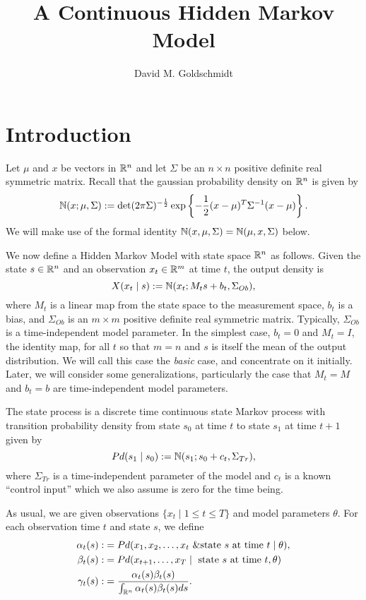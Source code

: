 \documentclass[12pt,leqno]{article}
\title{A Continuous Hidden Markov Model}
\author{David M. Goldschmidt}
\begin{document}
\newcommand{\p}{\ensuremath{u}}
\newcommand{\VV}{V}
\maketitle


\section{Introduction}
Let $\mu$ and $x$ be vectors in ${\mathbb R}^n$ and let $\Sigma$ be an $n\times{n}$ positive
definite real symmetric matrix.  Recall that the gaussian probability density
on ${\mathbb R}^n$ is given by 
$$
{\mathbb N}(x;\mu,\Sigma) := \det(2\pi\Sigma)^{-\frac{1}{2}}\exp\left\{-\frac{1}{2}
(x - \mu)^T\Sigma^{-1}(x-\mu)\right\}.
$$
We will make use of the formal identity ${\mathbb N}(x,\mu,\Sigma) = {\mathbb N}(\mu,x,\Sigma)$ below.

We now define a Hidden Markov Model with state space ${\mathbb R}^n$ as follows.  Given the state $s\in{\mathbb R}^n$ and an observation $x_t\in{\mathbb R}^m$ at time $t$, the output density is
$$
X(x_t\mid s) := {\mathbb N}(x_t;M_ts + b_t,\Sigma_{Ob}),
$$
where $M_t$ is a linear map from the state space to the
measurement space, $b_t$ is a bias, and $\Sigma_{Ob}$ is an $m\times{m}$ positive definite real symmetric matrix.  Typically, $\Sigma_{Ob}$ is a time-independent model parameter.
In the simplest case, $b_t = 0$  and $M_t = I$, the identity map, for all $t$ so that $m = n$ and $s$ is itself the mean of the output distribution.  We will call this case the {\em basic} case, and concentrate on it initially. Later, we will consider some generalizations, particularly the case that $M_t = M$ and $b_t = b$ are time-independent model parameters.

The state process is a discrete time continuous state Markov process with transition probability density
from state $s_0$ at time $t$ to state $s_1$ at time $t+1$ given by
$$
Pd(s_1\mid s_0) :=  {\mathbb N}(s_1;s_0+c_t,\Sigma_{Tr}),
$$
where $\Sigma_{Tr}$ is a time-independent parameter of the model
and $c_t$ is a known ``control input'' which we also assume is zero for the time being.

As usual, we are given observations $\{x_t\mid 1\le t\le T\}$ and model parameters $\theta$.  For each observation time $t$ and state $s$, we define
\begin{align*}
  \alpha_t(s) :&= Pd(x_1,x_2,\dots,x_t~ \& \text{state $s$ at time $t$}\mid \theta ),\\
  \beta_t(s) :&= Pd(x_{t+1},\dots,x_T \mid ~\text{state $s$ at time $t$},\theta)\\
  \gamma_t(s) :&= \frac{\alpha_t(s)\beta_t(s)}{\int_{{\mathbb R}^n}\alpha_t(s)\beta_t(s)ds}.
\end{align*}
\end{document}
